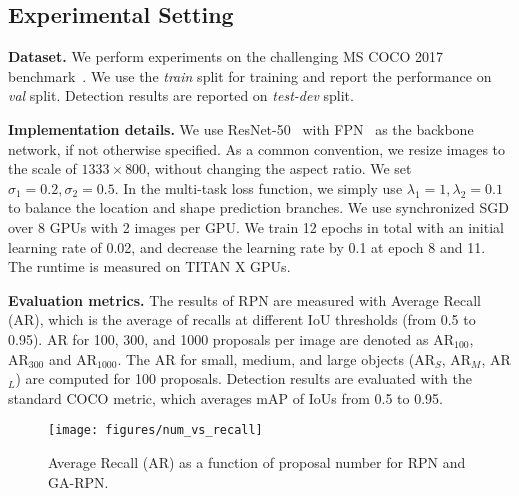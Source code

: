 \documentclass[10pt,twocolumn,letterpaper]{article}
\begin{document}
\subsection{Experimental Setting}

\noindent
\textbf{Dataset.}
We perform experiments on the challenging MS COCO 2017 benchmark~\cite{lin2014microsoft}.
We use the \emph{train} split for training and report the performance
on \emph{val} split. Detection results are reported on \emph{test-dev} split.

\noindent
\textbf{Implementation details.}
We use ResNet-50~\cite{he2016deep} with FPN~\cite{lin2017feature} as the
backbone network, if not otherwise specified.
As a common convention, we resize images to the scale of $1333\times800$,
without changing the aspect ratio.
We set $\sigma_1=0.2, \sigma_2=0.5$.
In the multi-task loss function, we simply use $\lambda_1=1, \lambda_2=0.1$ to
balance the location and shape prediction branches.
We use synchronized SGD over 8 GPUs with 2 images per GPU.
We train 12 epochs in total with an initial learning rate of 0.02,
and decrease the learning rate by 0.1 at epoch 8 and 11.
The runtime is measured on TITAN X GPUs.

\noindent
\textbf{Evaluation metrics.}
The results of RPN are measured with Average Recall (AR), which is the average
of recalls at different IoU thresholds (from 0.5 to 0.95). AR for 100, 300, and 1000 proposals
per image are denoted as $\text{AR}_{100}$, $\text{AR}_{300}$ and $\text{AR}_{1000}$.
The AR for small, medium, and large objects (AR$_S$, AR$_M$, AR$_L$)
are computed for 100 proposals.
Detection results are evaluated with the standard COCO metric, which averages mAP
of IoUs from 0.5 to 0.95.

\begin{figure}[t]
	\centering
	\texttt{[image: figures/num\_vs\_recall]}
	\caption{Average Recall (AR) as a function of proposal number for RPN and GA-RPN.\color{red}{We consider removing this figure to save space.}}
	\label{fig:num-vs-recall}
\end{figure}
\fi
\end{document}
